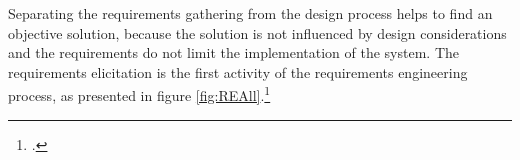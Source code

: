 Separating the requirements gathering from the design process helps to find an objective solution, because the solution is not influenced by design considerations and the requirements do not limit the implementation of the system. The requirements elicitation is the first activity of the requirements engineering process, as presented in figure \ref{fig:REAll}.\footcites[Cf.][p.116]{SommervilleSoftwareengineering2011}[cf.][pp.17]{SommervilleIntegratedrequirementsengineering2005} 

